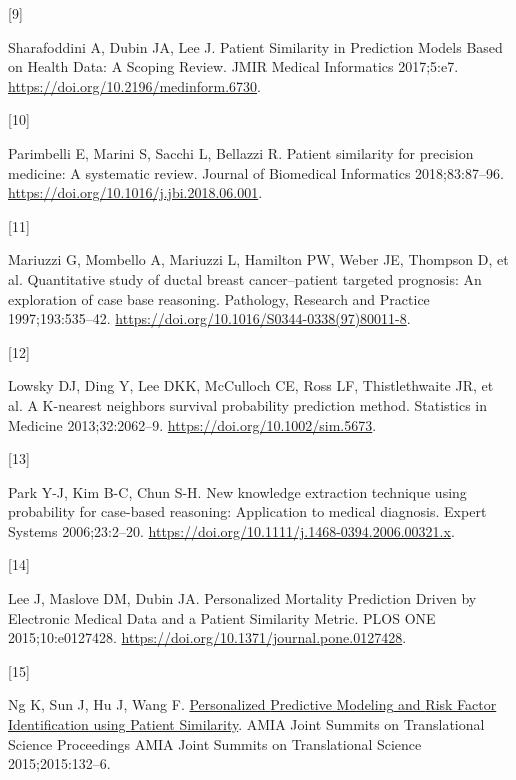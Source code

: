 \documentclass[preprint, 3p,
authoryear]{elsarticle} %
\newlength{\cslhangindent}
\newlength{\csllabelwidth}
\newlength{\cslentryspacingunit} %
\newenvironment{CSLReferences}[2] %
 {%
  \setlength{\parindent}{0pt}
  \ifodd #1
  \let\oldpar\par
  \def\par{\hangindent=\cslhangindent\oldpar}
  \fi
  \setlength{\parskip}{#2\cslentryspacingunit}
 }%
 {}
\newcommand{\CSLLeftMargin}[1]{\parbox[t]{\csllabelwidth}{#1}}
\newcommand{\CSLRightInline}[1]{\parbox[t]{\linewidth - \csllabelwidth}{#1}\break}
\begin{document}
\begin{CSLReferences}{0}{0}
\leavevmode{}%
\CSLLeftMargin{{[}9{]} }%
\CSLRightInline{Sharafoddini A, Dubin JA, Lee J. Patient {Similarity} in
{Prediction Models Based} on {Health Data}: {A Scoping Review}. JMIR
Medical Informatics 2017;5:e7.
\url{https://doi.org/10.2196/medinform.6730}.}

\leavevmode{}%
\CSLLeftMargin{{[}10{]} }%
\CSLRightInline{Parimbelli E, Marini S, Sacchi L, Bellazzi R. Patient
similarity for precision medicine: {A} systematic review. Journal of
Biomedical Informatics 2018;83:87--96.
\url{https://doi.org/10.1016/j.jbi.2018.06.001}.}

\leavevmode{}%
\CSLLeftMargin{{[}11{]} }%
\CSLRightInline{Mariuzzi G, Mombello A, Mariuzzi L, Hamilton PW, Weber
JE, Thompson D, et al. Quantitative study of ductal breast
cancer--patient targeted prognosis: An exploration of case base
reasoning. Pathology, Research and Practice 1997;193:535--42.
\url{https://doi.org/10.1016/S0344-0338(97)80011-8}.}

\leavevmode{}%
\CSLLeftMargin{{[}12{]} }%
\CSLRightInline{Lowsky DJ, Ding Y, Lee DKK, McCulloch CE, Ross LF,
Thistlethwaite JR, et al. A {K-nearest} neighbors survival probability
prediction method. Statistics in Medicine 2013;32:2062--9.
\url{https://doi.org/10.1002/sim.5673}.}

\leavevmode{}%
\CSLLeftMargin{{[}13{]} }%
\CSLRightInline{Park Y-J, Kim B-C, Chun S-H. New knowledge extraction
technique using probability for case-based reasoning: Application to
medical diagnosis. Expert Systems 2006;23:2--20.
\url{https://doi.org/10.1111/j.1468-0394.2006.00321.x}.}

\leavevmode{}%
\CSLLeftMargin{{[}14{]} }%
\CSLRightInline{Lee J, Maslove DM, Dubin JA. Personalized {Mortality
Prediction Driven} by {Electronic Medical Data} and a {Patient
Similarity Metric}. PLOS ONE 2015;10:e0127428.
\url{https://doi.org/10.1371/journal.pone.0127428}.}

\leavevmode{}%
\CSLLeftMargin{{[}15{]} }%
\CSLRightInline{Ng K, Sun J, Hu J, Wang F.
\href{https://www.ncbi.nlm.nih.gov/pmc/articles/PMC4525240}{Personalized
{Predictive Modeling} and {Risk Factor Identification} using {Patient
Similarity}}. AMIA Joint Summits on Translational Science Proceedings
AMIA Joint Summits on Translational Science 2015;2015:132--6.}


\end{CSLReferences}
\end{document}
